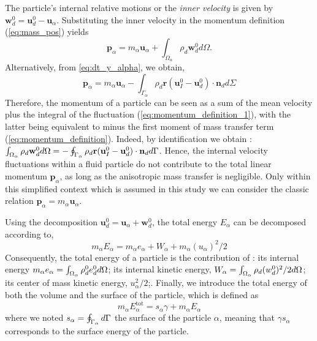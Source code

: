 The particle's internal relative motions or the \textit{inner velocity} is given by $\textbf{w}_d^0 = \textbf{u}_d^0 - \textbf{u}_\alpha$. 
Substituting the inner velocity in the momentum definition (\ref{eq:mass_pos}) yields
\begin{equation}
    \label{eq:momentum_definition_1}
    \textbf{p}_\alpha
    = m_\alpha \textbf{u}_\alpha
    + \int_{\Omega_\alpha} \rho_d \textbf{w}_d^0 d\Omega.
\end{equation}
Alternatively, from \eqref{eq:dt_y_alpha}, we obtain,
\begin{equation}
    \textbf{p}_\alpha
    =  m_\alpha \textbf{u}_\alpha
    - \int_{\Gamma_\alpha} \rho_d\textbf{r}(\textbf{u}_I^0 - \textbf{u}_d^0)\cdot \textbf{n}_d d\Sigma
    \label{eq:momentum_definition}
\end{equation}
Therefore, the momentum of a particle can be seen as a sum of the mean velocity plus the integral of the fluctuation (\ref{eq:momentum_definition_1}), with the latter being equivalent to minus the first moment of mass transfer term (\ref{eq:momentum_definition}).
Indeed, by identification we obtain : $\int_{\Omega_{\alpha}}  \rho_d \textbf{w}_d^0  d\Omega = - \oint_{\Gamma_{\alpha}}   \rho_d\textbf{r} (\textbf{u}_I^0 - \textbf{u}_d^0)\cdot \textbf{n}_d  d\Gamma$. 
Hence, the internal velocity fluctuations within a fluid particle do not contribute to the total linear momentum $\textbf{p}_\alpha$, as long as the anisotropic mass transfer is negligible.  
Only within this simplified context which is assumed in this study we can consider the classic relation $\textbf{p}_\alpha = m_\alpha \textbf{u}_\alpha$. 


Using the decomposition $\textbf{u}_d^0 = \textbf{u}_\alpha + \textbf{w}_d^0$, the total energy $E_\alpha$ can be decomposed according to,
\begin{equation*}
    \label{eq:E_alpha_def}
    m_\alpha E_\alpha
    = m_\alpha e_\alpha 
    + W_\alpha
    + m_\alpha (u_\alpha)^2/2
\end{equation*}
Consequently, the total energy of a particle is the contribution of :
its internal energy $m_\alpha e_\alpha = \int_{\Omega_{\alpha}} \rho_d^0 e_d^0 d\Omega$; 
its internal kinetic energy, $W_\alpha =  \int_{\Omega_{\alpha}} \rho_d  (w_d^0)^2/2  d\Omega$;
its center of mass kinetic energy, $u_\alpha^2/2$;. 
Finally, we introduce the total energy of both the volume and the surface of the particle, which is defined as 
\begin{equation*}
    m_\alpha E_\alpha^\text{tot}
    = 
    s_\alpha \gamma 
    + m_\alpha E_\alpha
\end{equation*}
where we noted $s_\alpha = \oint_{\Gamma_{\alpha}}  d\Gamma$ the surface of the particle $\alpha$, meaning that  $\gamma s_\alpha $ corresponds to the surface energy of the particle. 


